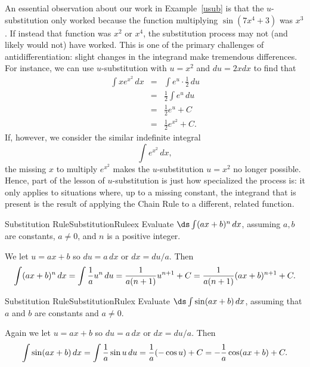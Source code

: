An essential observation about our work in Example~\ref{usub}  is that the $u$-substitution only worked because the function multiplying $\sin (7x^4 + 3)$ was $x^3$.  If instead that function was $x^2$ or $x^4$, the substitution process may not (and likely would not) have worked.  This is one of the primary challenges of antidifferentiation: slight changes in the integrand make tremendous differences.  For instance, we can use $u$-substitution with $u = x^2$ and $du = 2xdx$ to find that
\begin{eqnarray*}
\int xe^{x^2} \, dx & = & \int e^u \cdot \frac{1}{2} \, du \\
			& = & \frac{1}{2} \int e^u \, du \\
			& = & \frac{1}{2} e^u + C \\
			& = & \frac{1}{2} e^{x^2} + C.
\end{eqnarray*}
If, however, we consider the similar indefinite integral
$$\int e^{x^2} \, dx,$$
the missing $x$ to multiply $e^{x^2}$ makes the $u$-substitution $u = x^2$ no longer possible.  Hence, part of the lesson of $u$-substitution is just how specialized the process is: it only applies to situations where, up to a missing constant, the integrand that is present is the result of applying the Chain Rule to a different, related function.



\begin{example}{Substitution Rule}{SubstitutionRuleex}
Evaluate $\ds\int(ax+b)^n\,dx$, assuming $a,b$ are
constants, $a\not=0$, and $n$ is a positive integer.
\end{example}

\begin{solution} 
We let $u=ax+b$ so $du=a\,dx$ or $dx=du/a$. Then
$$
  \int(ax+b)^n\,dx=\int {1\over a} u^n\,du={1\over a(n+1)}u^{n+1}+C=
  {1\over a(n+1)}(ax+b)^{n+1}+C.
$$
\end{solution}

\begin{example}{Substitution Rule}{SubstitutionRulex}
Evaluate $\ds\int \sin(ax+b)\,dx$, assuming that $a$ and $b$ are
constants and $a\not=0$.
\end{example}

\begin{solution} 
Again we let $u=ax+b$ so $du=a\,dx$ or $dx=du/a$. Then
$$
  \int\sin(ax+b)\,dx=\int {1\over a} \sin u\,du={1\over a}(-\cos u)+C=
-{1\over a}\cos(ax+b)+C.
$$
\end{solution}

